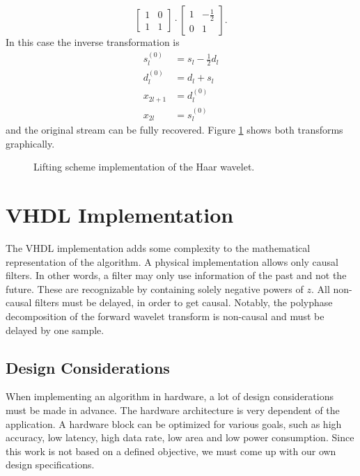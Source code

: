 \begin{refsection}
\begin{equation*}
\begin{bmatrix}
		1 & 0 \\
		1 & 1
	\end{bmatrix}
	\cdot
	\begin{bmatrix}
		1 & -\frac{1}{2} \\
		0 & 1
	\end{bmatrix}
	.
\end{equation*}
In this case the inverse transformation is 
\begin{align}\label{fpga:equation:inv_haar}
	s_l^{(0)} &= s_l - \frac{1}{2}d_l \\
	d_l^{(0)} &= d_l + s_l \\ 
	x_{2l+1}& =d_l^{(0)} \\
	x_{2l} &= s_l^{(0)}
\end{align}
and the original stream can be fully recovered.
Figure \ref{fpga:fig:liftingStepHaar} shows both transforms graphically.
\begin{figure}
	\centering
	
	\caption{Lifting scheme implementation of the Haar wavelet.}
	\label{fpga:fig:liftingStepHaar}
\end{figure}

\section{VHDL Implementation}

The VHDL implementation adds some complexity to the mathematical representation of the algorithm.
A physical implementation allows only causal filters.
In other words, a filter may only use information of the past and not the future.
These are recognizable by containing solely negative powers of $z$.
All non-causal filters must be delayed, in order to get causal.
Notably, the polyphase decomposition of the forward wavelet transform is non-causal and must be delayed by one sample.

\subsection{Design Considerations}

When implementing an algorithm in hardware, a lot of design considerations must be made in advance.
The hardware architecture is very dependent of the application.
A hardware block can be optimized for various goals, such as high accuracy, low latency, high data rate, low area and low power consumption.
Since this work is not based on a defined objective, we must come up with our own design specifications.


\end{refsection}
